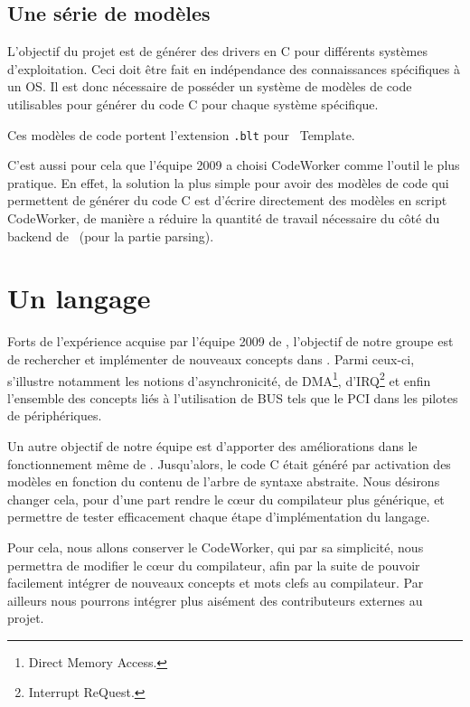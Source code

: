 \documentclass{rtxreport}
\begin{document}
\subsection{Une série de modèles}

L'objectif du projet est de générer des drivers en C pour différents systèmes
d'exploitation. Ceci doit être fait en indépendance des connaissances
spécifiques à un OS. Il est donc nécessaire de posséder un système de modèles
de code utilisables pour générer du code C pour chaque système spécifique.

Ces modèles de code portent l'extension \texttt{.blt} pour \BL\ Template.

C'est aussi pour cela que l'équipe 2009 a choisi CodeWorker comme l'outil le plus
pratique. En effet, la solution la plus simple pour avoir des modèles de code
qui permettent de générer du code C est d'écrire directement des modèles
en script CodeWorker, de manière a réduire la quantité de travail nécessaire
du côté du backend de \rtx\ (pour la partie parsing).

\section{Un langage}

Forts de l'expérience acquise par l'équipe 2009 de \rtx, l'objectif de
notre groupe est de rechercher et implémenter de nouveaux concepts dans
\rtx. Parmi ceux-ci, s'illustre notamment les notions d'asynchronicité,
de DMA\footnote{Direct Memory Access.}, d'IRQ\footnote{Interrupt ReQuest.} et
enfin l'ensemble des concepts liés à l'utilisation de BUS tels que le PCI dans
les pilotes de périphériques.

Un autre objectif de notre équipe est d'apporter des améliorations dans le
fonctionnement même de \rtx. Jusqu'alors, le code C était généré par
activation des modèles en fonction du contenu de l'arbre de syntaxe abstraite.
Nous désirons changer cela, pour d'une part rendre le cœur du compilateur
plus générique, et permettre de tester efficacement chaque étape
d'implémentation du langage.

Pour cela, nous allons conserver le CodeWorker, qui par sa simplicité, nous
permettra de modifier le cœur du compilateur, afin par la suite de pouvoir
facilement intégrer de nouveaux concepts et mots clefs au compilateur. Par
ailleurs nous pourrons intégrer plus aisément des contributeurs externes au
projet.

\newpage

\rtxbibliography
\end{document}
